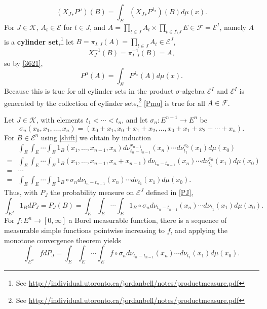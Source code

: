 \documentclass{article}
\theoremstyle{definition}
\begin{document}
\begin{equation}
({X_J}_*P^{\mu})(B) = \int_E ({X_J}_*P^{\delta_x})(B)d\mu(x).
\label{3621}
\end{equation}
For $J \in \mathscr{K}$, $A_t \in \mathscr{E}$ for $t \in J$, and $A = \prod_{t \in J} A_t \times \prod_{t \in I \setminus J} E \in \mathscr{F}=\mathscr{E}^I$, namely
$A$ is a \textbf{cylinder set},\footnote{See \url{http://individual.utoronto.ca/jordanbell/notes/productmeasure.pdf}}
let $B=\pi_{I,J}(A)=\prod_{t \in J} A_t \in \mathscr{E}^J$,
\[
X_J^{-1}(B) = \pi_{I,J}^{-1}(B) = A,
\]
so by \eqref{3621},
\begin{equation}
P^\mu(A) = \int_E P^{\delta_x}(A) d\mu(x).
\label{Pmu}
\end{equation}
Because this is true for all cylinder sets in the product $\sigma$-algebra $\mathscr{E}^I$ and
$\mathscr{E}^I$ is generated 
by the collection of cylinder sets,\footnote{See
\url{http://individual.utoronto.ca/jordanbell/notes/productmeasure.pdf}}
\eqref{Pmu} is true for all $A \in \mathscr{F}$. 


Let $J \in \mathscr{K}$, with elements $t_1<\cdots<t_n$, 
and let $\sigma_n:E^{n+1} \to E^n$ be
\[
\sigma_n(x_0,x_1,\ldots,x_n) = (x_0+x_1,x_0+x_1+x_2,\ldots,x_0+x_1+x_2+\cdots+x_n).
\]
For $B \in \mathscr{E}^n$ using \eqref{shift} we obtain by induction
\[
\begin{split}
&\int_E \int_E \cdots \int_E 1_B(x_1,\ldots,x_{n-1},x_n) 
d\nu_{t_n-t_{n-1}}^{x_{n-1}}(x_n) \cdots d\nu_{t_1}^{x_0} (x_1) d\mu(x_0)\\
=&\int_E \int_E \cdots \int_E 1_B(x_1,\ldots,x_{n-1},x_n+x_{n-1}) d\nu_{t_n-t_{n-1}}(x_n) \cdots d\nu_{t_1}^{x_0} (x_1) d\mu(x_0)\\
=&\cdots\\
=&\int_E \int_E \cdots \int_E 1_B \circ \sigma_n d\nu_{t_n-t_{n-1}}(x_n) \cdots d\nu_{t_1}(x_1) d\mu(x_0).
\end{split}
\]
Thus, with $P_J$ the probability measure on $\mathscr{E}^J$ defined in \eqref{PJ},
\[
\int_{E^J} 1_B dP_J = P_J(B) = \int_E \int_E \cdots \int_E 1_B \circ \sigma_n d\nu_{t_n-t_{n-1}}(x_n) \cdots d\nu_{t_1}(x_1) d\mu(x_0).
\]
For $f:E^n \to [0,\infty]$ a Borel measurable function, there is a sequence of measurable simple functions pointwise increasing to $f$, and applying
the monotone convergence theorem yields 
\begin{equation}
\int_{E^n} f dP_J
=\int_E \int_E \cdots \int_E f \circ \sigma_n d\nu_{t_n-t_{n-1}}(x_n) \cdots d\nu_{t_1}(x_1) d\mu(x_0).
\label{373}
\end{equation}
\end{document}
